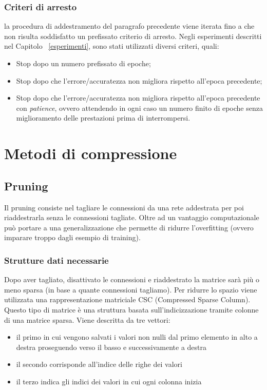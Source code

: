 \documentclass[11pt,a4paper,twoside,
openright]{book}
\begin{document}
\subsection*{Criteri di arresto}
la procedura di addestramento del paragrafo precedente viene iterata fino a che non risulta soddisfatto un prefissato criterio di arresto. Negli esperimenti descritti nel Capitolo ~\ref{esperimenti}, sono stati utilizzati diversi criteri, quali:

\begin{itemize}
\item Stop dopo un numero prefissato di epoche;
\item Stop dopo che l'errore/accuratezza non migliora rispetto all'epoca precedente;
\item Stop dopo che l'errore/accuratezza non migliora rispetto all'epoca precedente con \textit{patience}, ovvero attendendo in ogni caso un numero finito di epoche senza miglioramento delle prestazioni prima di interrompersi.
\end{itemize}

\chapter{Metodi di compressione}
\section{Pruning}
Il pruning consiste nel tagliare le connessioni da una rete addestrata per poi riaddestrarla senza le connessioni tagliate.
Oltre ad un vantaggio computazionale può portare a una generalizzazione che permette di ridurre l'overfitting (ovvero imparare troppo dagli esempio di training).
\subsection{Strutture dati necessarie}
Dopo aver tagliato, disattivato le connessioni e riaddestrato la matrice sarà più o meno sparsa (in base a quante connessioni tagliamo). Per ridurre lo spazio viene utilizzata una rappresentazione matriciale CSC (Compressed Sparse Column).
Questo tipo di matrice è una struttura basata sull'indicizzazione tramite colonne di una matrice sparsa. Viene descritta da tre vettori:
\begin{itemize}
\item il primo in cui vengono salvati i valori non nulli dal primo elemento in alto a destra proseguendo verso il basso e successivamente a destra
\item il secondo corrisponde all'indice delle righe dei valori
\item il terzo indica gli indici dei valori in cui ogni colonna inizia
\end{itemize}
\end{document}
